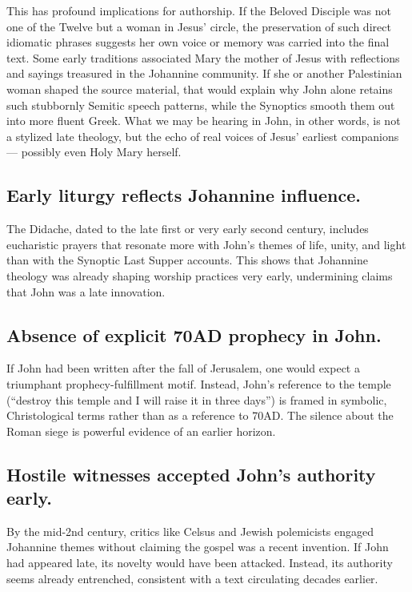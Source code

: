 This has profound implications for authorship.
If the Beloved Disciple was not one of the Twelve but a woman in Jesus’ circle, the preservation of such direct idiomatic phrases suggests her own voice or memory was carried into the final text.
Some early traditions associated Mary the mother of Jesus with reflections and sayings treasured in the Johannine community.
If she or another Palestinian woman shaped the source material, that would explain why John alone retains such stubbornly Semitic speech patterns, while the Synoptics smooth them out into more fluent Greek.
What we may be hearing in John, in other words, is not a stylized late theology, but the echo of real voices of Jesus’ earliest companions — possibly even Holy Mary herself.

\subsection{Early liturgy reflects Johannine influence.}\label{subsec:early-liturgy-reflects-johannine-influence.}

The Didache, dated to the late first or very early second century, includes eucharistic prayers that resonate more with John’s themes of life, unity, and light than with the Synoptic Last Supper accounts.
This shows that Johannine theology was already shaping worship practices very early, undermining claims that John was a late innovation.

\subsection{Absence of explicit 70AD prophecy in John.}\label{subsec:absence-of-explicit-70ad-prophecy-in-john.}

If John had been written after the fall of Jerusalem, one would expect a triumphant prophecy-fulfillment motif.
Instead, John’s reference to the temple (“destroy this temple and I will raise it in three days”) is framed in symbolic, Christological terms rather than as a reference to 70AD.
The silence about the Roman siege is powerful evidence of an earlier horizon.

\subsection{Hostile witnesses accepted John’s authority early.}\label{subsec:hostile-witnesses-accepted-johns-authority-early.}

By the mid-2nd century, critics like Celsus and Jewish polemicists engaged Johannine themes without claiming the gospel was a recent invention.
If John had appeared late, its novelty would have been attacked.
Instead, its authority seems already entrenched, consistent with a text circulating decades earlier.

